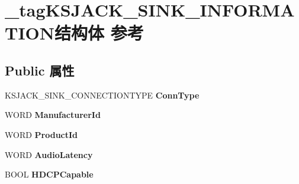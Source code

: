 \hypertarget{struct__tag_k_s_j_a_c_k___s_i_n_k___i_n_f_o_r_m_a_t_i_o_n}{}\section{\+\_\+tag\+K\+S\+J\+A\+C\+K\+\_\+\+S\+I\+N\+K\+\_\+\+I\+N\+F\+O\+R\+M\+A\+T\+I\+O\+N结构体 参考}
\label{struct__tag_k_s_j_a_c_k___s_i_n_k___i_n_f_o_r_m_a_t_i_o_n}
\subsection*{Public 属性}
\begin{DoxyCompactItemize}
\item 
\mbox{\label{struct__tag_k_s_j_a_c_k___s_i_n_k___i_n_f_o_r_m_a_t_i_o_n_a76a1f94b63acf9e93ad5e514d1529fff}} 
K\+S\+J\+A\+C\+K\+\_\+\+S\+I\+N\+K\+\_\+\+C\+O\+N\+N\+E\+C\+T\+I\+O\+N\+T\+Y\+PE {\bfseries Conn\+Type}
\item 
\mbox{\label{struct__tag_k_s_j_a_c_k___s_i_n_k___i_n_f_o_r_m_a_t_i_o_n_a5ddb4fe684d3bf9f816ea863707e4b16}} 
W\+O\+RD {\bfseries Manufacturer\+Id}
\item 
\mbox{\label{struct__tag_k_s_j_a_c_k___s_i_n_k___i_n_f_o_r_m_a_t_i_o_n_a2989c04dc0b03132263e68b73926142c}} 
W\+O\+RD {\bfseries Product\+Id}
\item 
\mbox{\label{struct__tag_k_s_j_a_c_k___s_i_n_k___i_n_f_o_r_m_a_t_i_o_n_a04fbeeacd3dcc7ab81de1105539df498}} 
W\+O\+RD {\bfseries Audio\+Latency}
\item 
\mbox{\label{struct__tag_k_s_j_a_c_k___s_i_n_k___i_n_f_o_r_m_a_t_i_o_n_a41120f4b01ceb6e32e8315b42bdb5f76}} 
B\+O\+OL {\bfseries H\+D\+C\+P\+Capable}
\item 
\mbox{\label{struct__tag_k_s_j_a_c_k___s_i_n_k___i_n_f_o_r_m_a_t_i_o_n_a5cb77b78de1b1861e5e3138e8a783b67}} 

\end{DoxyCompactItemize}

